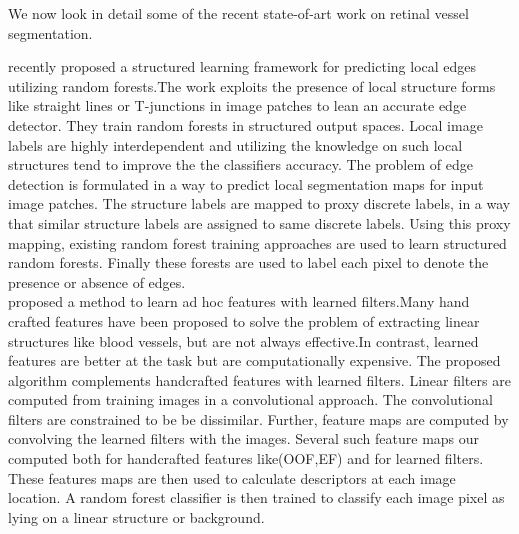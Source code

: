 We now look in detail some of the recent state-of-art work on retinal vessel segmentation.

\citet{dollar2013structured} recently proposed a structured learning framework for predicting local edges utilizing random forests.The work exploits the presence of local structure forms like straight lines or T-junctions in image patches to lean an accurate edge detector. They train random forests in structured output spaces. Local image labels are highly interdependent and utilizing the knowledge on such local structures tend to improve the the classifiers accuracy. The problem of edge detection is formulated in a way to predict local segmentation maps for input image patches.  The structure labels are mapped to proxy discrete labels, in a way that similar structure labels are assigned to same discrete labels. Using this proxy mapping, existing random forest training approaches are used to learn structured random forests. Finally these forests are used to label each pixel to denote the presence or absence of edges.\\


\citet{rigamonti2012accurate} proposed a method to learn ad hoc features with learned filters.Many hand crafted features have been proposed to solve the problem of extracting linear structures like blood vessels, but are not always effective.In contrast, learned features are better at the task but are computationally expensive. The proposed algorithm complements handcrafted features with learned filters. Linear filters are computed from training images in a convolutional approach. The convolutional filters are constrained to be be dissimilar. Further, feature maps are computed by convolving the learned filters with the images. Several such feature maps our computed both for handcrafted features like(OOF,EF) and for learned filters. These features maps are then used to calculate descriptors at each image location. A random forest classifier is then trained to classify each image pixel as lying on a linear structure or background.\\

